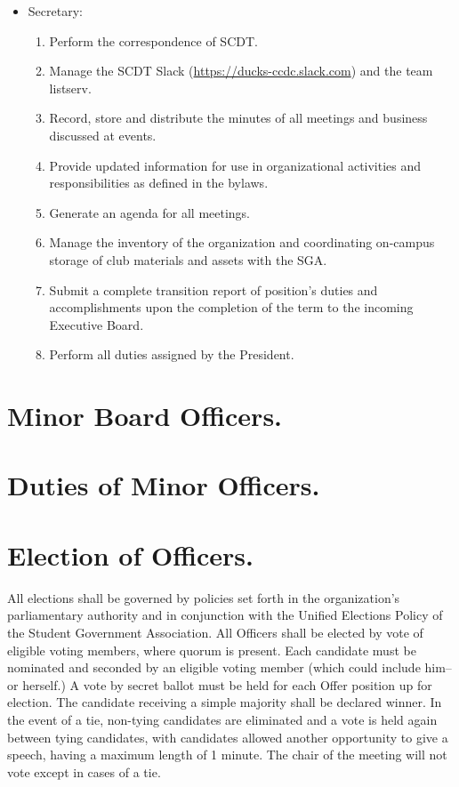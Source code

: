\documentclass[12pt]{constitution}
\begin{document}
\begin{itemize}
    \item Secretary:
        \begin{enumerate}
            \item Perform the correspondence of SCDT.
            \item Manage the SCDT Slack (\url{https://ducks-ccdc.slack.com}) and the team listserv.
            \item Record, store and distribute the minutes of all meetings and
            business discussed at events.
            \item Provide updated information for use in organizational
            activities and responsibilities as defined in the bylaws.
            \item Generate an agenda for all meetings.
            \item Manage the inventory of the organization and coordinating
            on-campus storage of club materials and assets with the SGA.
            \item Submit a complete transition report of position’s duties and
            accomplishments upon the completion of the term to the incoming
            Executive Board.
            \item Perform all duties assigned by the President.
        \end{enumerate}
\end{itemize}

\section{Minor Board Officers.}\label{sec:MINOR-OFFICERS}

\section{Duties of Minor Officers.}\label{sec:MINOR-DUTIES}

\section{Election of Officers.}\label{sec:ELECTION-OF-OFFICERS}

All elections shall be governed by policies set forth in the organization’s
parliamentary authority and in conjunction with the Unified Elections Policy of
the Student Government Association. All Officers shall be elected by vote of
eligible voting members, where quorum is present. Each candidate must be
nominated and seconded by an eligible voting member (which could include him--
or herself.) A vote by secret ballot must be held for each Offer position up for
election. The candidate receiving a simple majority shall be declared winner. In
the event of a tie, non-tying candidates are eliminated and a vote is held again
between tying candidates, with candidates allowed another opportunity to give a
speech, having a maximum length of 1 minute. The chair of the meeting will not
vote except in cases of a tie.
\end{document}
